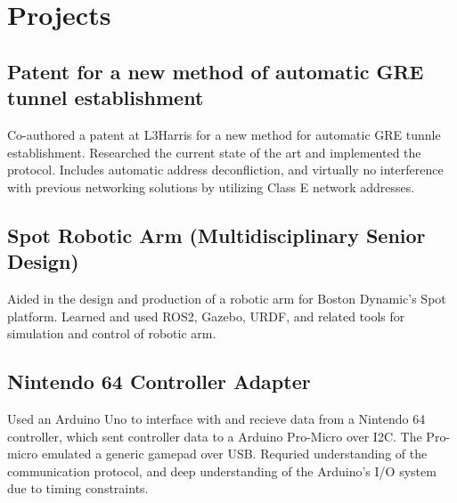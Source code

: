\documentclass{article}
\begin{document}
\section{Projects}
    \subsection{Patent for a new method of automatic GRE tunnel establishment}
    Co-authored a patent at L3Harris for a new method for automatic GRE tunnle
    establishment. Researched the current state of the art and implemented
    the protocol. Includes automatic address deconfliction, and virtually no
    interference with previous networking solutions by utilizing Class E network
    addresses.

    \subsection{Spot Robotic Arm (Multidisciplinary Senior Design)}
    Aided in the design and production of a robotic arm for Boston Dynamic's Spot platform.
    Learned and used ROS2, Gazebo, URDF, and related tools for simulation and
    control of robotic arm.

    \subsection{Nintendo 64 Controller Adapter}
    Used an Arduino Uno to interface with and recieve data from a Nintendo 64
    controller, which sent controller data to a Arduino Pro-Micro over I2C. The
    Pro-micro emulated a generic gamepad over USB. Requried understanding of the
    communication protocol, and deep understanding of the Arduino's I/O system due 
    to timing constraints.


\end{document}
